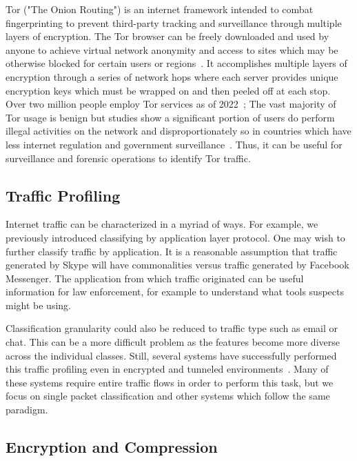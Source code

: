 Tor ("The Onion Routing") is an internet framework intended to combat fingerprinting to prevent third-party tracking and surveillance through multiple layers of encryption. The Tor browser can be freely downloaded and used by anyone to achieve virtual network anonymity and access to sites which may be otherwise blocked for certain users or regions~\cite{tor}. It accomplishes multiple layers of encryption through a series of network hops where each server provides unique encryption keys which must be wrapped on and then peeled off at each stop. Over two million people employ Tor services as of 2022~\cite{tor}; The vast majority of Tor usage is benign but studies show a significant portion of users do perform illegal activities on the network and disproportionately so in countries which have less internet regulation and government surveillance~\cite{Jardine2020ThePH}. Thus, it can be useful for surveillance and forensic operations to identify Tor traffic.

\subsection{Traffic Profiling}

Internet traffic can be characterized in a myriad of ways. For example, we previously introduced classifying by application layer protocol. One may wish to further classify traffic by application. It is a reasonable assumption that traffic generated by Skype will have commonalities versus traffic generated by Facebook Messenger. The application from which traffic originated can be useful information for law enforcement, for example to understand what tools suspects might be using.

Classification granularity could also be reduced to traffic type such as email or chat. This can be a more difficult problem as the features become more diverse across the individual classes. Still, several systems have successfully performed this traffic profiling even in encrypted and tunneled environments~\cite{iscx-tor-paper, iscx-vpn-paper, deeppacket, didarknet}. Many of these systems require entire traffic flows in order to perform this task, but we focus on single packet classification and other systems which follow the same paradigm.

\subsection{Encryption and Compression}

